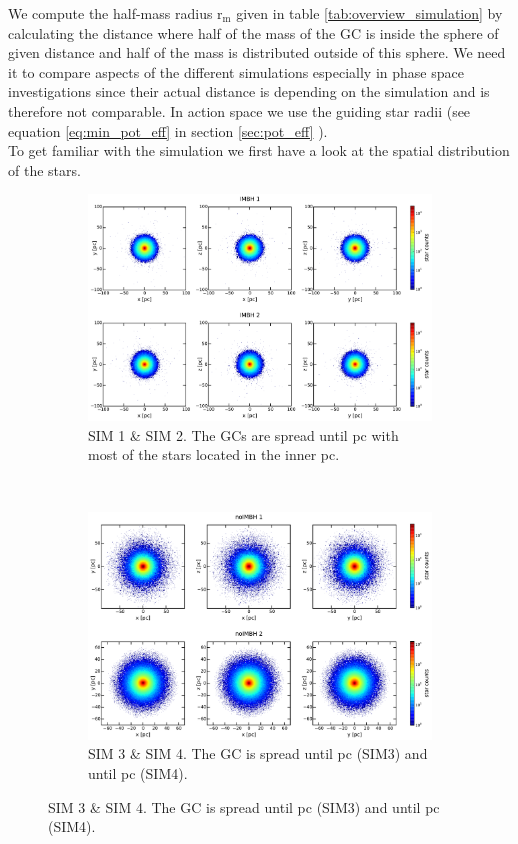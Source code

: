 \par We compute the half-mass radius \(\mathrm{r_m}\) given in table \ref{tab:overview_simulation} by calculating the distance where half of the mass of the \ac{GC} is inside the sphere of given distance and half of the mass is distributed outside of this sphere. We need it to compare aspects of the different simulations especially in phase space investigations since their actual distance is depending on the simulation and is therefore not comparable. In action space we use the guiding star radii (see equation \eqref{eq:min_pot_eff} in section \ref{sec:pot_eff} ).
\\
To get familiar with the simulation we first have a look at the spatial distribution of the stars.
\begin{figure}[htbp] 
\centering
\begin{subfigure}{0.9\textwidth}
	\centering
  	\includegraphics[width=\textwidth]{Plots/position_scatter_plot_IMBH.pdf}
  	\caption{SIM 1 \& SIM 2. The \acp{GC} are spread until \unit[100]{pc} with most of the stars located in the inner \unit[40]{pc}.}
 	\label{fig:pos_scat_IMBH}
\end{subfigure}
\\
\begin{subfigure}{0.9\textwidth}
	\centering
  	\includegraphics[width=\textwidth]{Plots/position_scatter_plot_noIMBH.pdf}
  	\caption{SIM 3 \& SIM 4. The \ac{GC} is spread until \unit[90]{pc} (SIM3) and until \unit[60]{pc} (SIM4).}
 	\label{fig:pos_scat_noIMBH}
\end{subfigure}


\end{figure}
